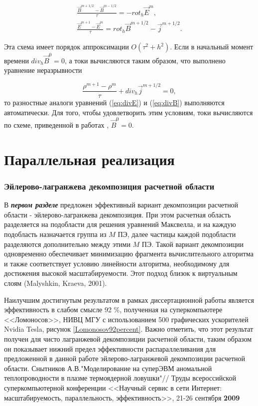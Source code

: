 \begin{equation}
\label{FDTD}
\begin{array}{c}
\frac{{\vec{B}}^{m+1/2}-{\vec{B}}^{m-1/2}}{\tau}=-rot_h {\vec{E}}^m,
\\
\frac{{\vec{E}}^{m+1}-{\vec{E}}^m}{\tau}=rot_h {\vec{B}}^{m+1/2} - {\vec{j}}^{m+1/2}.
\end{array}
\end{equation}



Эта схема имеет порядок аппроксимации $O(\tau^2+h^2)$. Если в начальный момент времени $div_h{\vec{B}}^0=0$, а токи вычисляются таким образом, что выполнено уравнение неразрывности 

\begin{equation}
\frac{\rho^{m+1}-\rho^m}{\tau}+div_h {\vec{j}}^{m+1/2}=0,
\end{equation}
то разностные аналоги уравнений (\ref{eq:divE}) и (\ref{eq:divB}) выполняются автоматически.
Для того, чтобы удовлетворить этим условиям, токи вычисляются по схеме, приведенной в работах \cite{VshivkovPICbook, laser}, ${\vec{B}}^0=0$. 

\section{ Параллельная реализация} 

\subsubsection{Эйлерово-лагранжева декомпозиция расчетной области}



В \textbf{\textit{первом разделе}}  предложен эффективный вариант декомпозиции расчетной области - эйлерово-лагранжева декомпозиция.
При этом расчетная область разделяется на подобласти для решения уравнений Максвелла, и на каждую подобласть назначается группа из $M$ ПЭ, далее частицы каждой подобласти разделяются дополнительно между этими $M$ ПЭ. Такой вариант декомпозиции одновременно обеспечивает минимизацию фрагмента вычислительного алгоритма и также соответствует условию линейности алгоритма, необходимому для достижения высокой масштабируемости. Этот подход близок к виртуальным слоям (Malyshkin, Kraeva, 2001).

Наилучшим достигнутым результатом в рамках диссертационной работы является эффективность в слабом смысле 92 \%, полученная на суперкомпьютере <<Ломоносов>>, НИВЦ МГУ с использованием 500 графических ускорителей Nvidia Tesla, рисунок  \ref{Lomonosov92percent}.
Важно отметить, что этот результат получен для чисто лагранжевой декомпозиции расчетной области, таким образом он показывает нижний предел эффективности распараллеливания для предложенной в данной работе эйлерово-лагранжевой декомпозиции расчетной области.
{\small Снытников А.В."Моделирование на суперЭВМ аномальной  теплопроводности в плазме термоядерной ловушки"// Труды всероссийской суперкомпьютерной конференции <<Научный сервис в сети Интернет: масштабируемость, параллельность, эффективность>>, 21-26 сентября \textbf{2009}}


